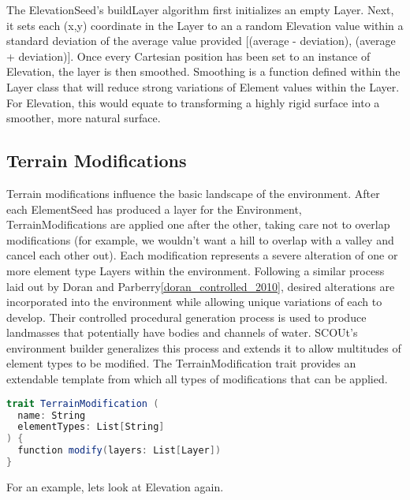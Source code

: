 The ElevationSeed’s buildLayer algorithm first initializes an empty Layer.
Next, it sets each (x,y) coordinate in the Layer to an a random Elevation value within a standard deviation of the average value provided [(average - deviation), (average + deviation)].
Once every Cartesian position has been set to an instance of Elevation, the layer is then smoothed.
Smoothing is a function defined within the Layer class that will reduce strong variations of Element values within the Layer.
For Elevation, this would equate to transforming a highly rigid surface into a smoother, more natural surface.



\subsection{Terrain Modifications}
Terrain modifications influence the basic landscape of the environment.
After each ElementSeed has produced a layer for the Environment, TerrainModifications are applied one after the other, taking care not to overlap modifications (for example, we wouldn't want a hill to overlap with a valley and cancel each other out).
Each modification represents a severe alteration of one or more element type Layers within the environment.
Following a similar process laid out by Doran and Parberry\ref{doran_controlled_2010}, desired alterations are incorporated into the environment while allowing unique variations of each to develop.
Their controlled procedural generation process is used to produce landmasses that potentially have bodies and channels of water.
SCOUt's environment builder generalizes this process and extends it to allow multitudes of element types to be modified.
The TerrainModification trait provides an extendable template from which all types of modifications that can be applied.

\begin{lstlisting}[language=Scala]
trait TerrainModification (
  name: String
  elementTypes: List[String]
) {
  function modify(layers: List[Layer])
}
\end{lstlisting}


For an example, lets look at Elevation again.


